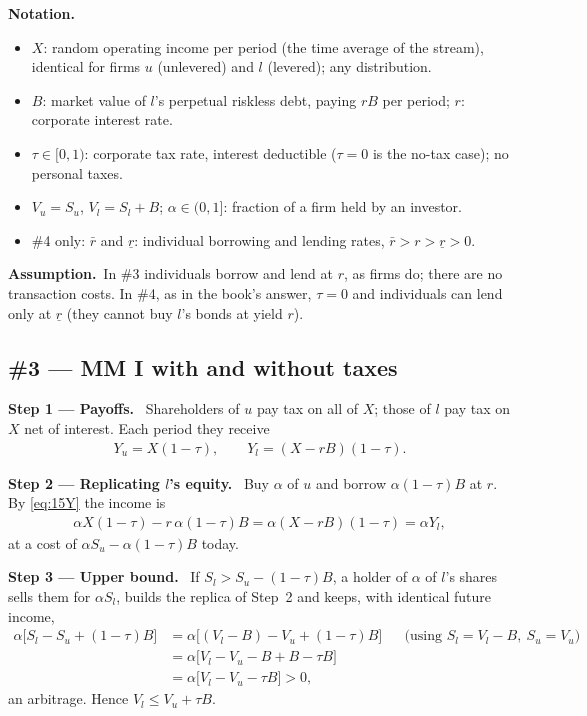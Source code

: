 \documentclass[11pt,a4paper]{article}
\numberwithin{equation}{section}
\newcommand{\notation}{\par\smallskip\noindent\textbf{Notation.}}
\newcommand{\step}[2]{\par\smallskip\noindent\textbf{Step #1 --- #2.}~}
\newcommand{\assumption}{\par\smallskip\noindent\textbf{Assumption.}~}
\begin{document}
\notation
\begin{itemize}
  \item $X$: random operating income per period (the time average of the stream), identical for firms $u$ (unlevered) and $l$ (levered); any distribution.
  \item $B$: market value of $l$'s perpetual riskless debt, paying $rB$ per period; $r$: corporate interest rate.
  \item $\tau\in[0,1)$: corporate tax rate, interest deductible ($\tau=0$ is the no-tax case); no personal taxes.
  \item $V_u=S_u$, $V_l=S_l+B$; $\alpha\in(0,1]$: fraction of a firm held by an investor.
  \item \#4 only: $\bar r$ and $\underline r$: individual borrowing and lending rates, $\bar r>r>\underline r>0$.
\end{itemize}

\assumption In \#3 individuals borrow and lend at $r$, as firms do; there are no transaction
costs. In \#4, as in the book's answer, $\tau=0$ and individuals can lend only at $\underline r$
(they cannot buy $l$'s bonds at yield $r$).

\subsection*{\#3 --- MM I with and without taxes}

\step{1}{Payoffs} Shareholders of $u$ pay tax on all of $X$; those of $l$ pay tax on $X$ net of
interest. Each period they receive
\begin{align}
  Y_u = X(1-\tau), \qquad Y_l = (X-rB)(1-\tau). \label{eq:15Y}
\end{align}

\step{2}{Replicating $l$'s equity} Buy $\alpha$ of $u$ and borrow $\alpha(1-\tau)B$ at $r$. By \eqref{eq:15Y} the income is
\begin{align}
  \alpha X(1-\tau) - r\,\alpha(1-\tau)B = \alpha(X-rB)(1-\tau) = \alpha Y_l, \nonumber
\end{align}
at a cost of $\alpha S_u-\alpha(1-\tau)B$ today.

\step{3}{Upper bound} If $S_l>S_u-(1-\tau)B$, a holder of $\alpha$ of $l$'s shares sells them for
$\alpha S_l$, builds the replica of Step~2 and keeps, with identical future income,
\begin{align}
  \alpha\bigl[S_l-S_u+(1-\tau)B\bigr] &= \alpha\bigl[(V_l-B)-V_u+(1-\tau)B\bigr] && \text{(using } S_l=V_l-B,\ S_u=V_u) \nonumber\\
      &= \alpha\bigl[V_l-V_u-B+B-\tau B\bigr] \nonumber\\
      &= \alpha\bigl[V_l-V_u-\tau B\bigr] > 0, \nonumber
\end{align}
an arbitrage. Hence $V_l\le V_u+\tau B$.
\end{document}
